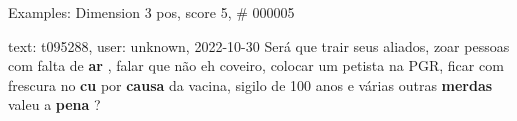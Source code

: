 \begin{frame}{Examples: Dimension 3 pos, score 5, \# 000005}
\footnotesize
\begin{exampleblock}{text: t095288, user: unknown, 2022-10-30}
Será que trair seus aliados, zoar pessoas com falta de \textbf{ar} , falar que 
não eh coveiro, colocar um petista na PGR, ficar com frescura no \textbf{cu} 
por \textbf{causa} da vacina, sigilo de 100 anos e várias outras 
\textbf{merdas} valeu a \textbf{pena} ? 
\end{exampleblock}
\end{frame}
